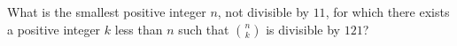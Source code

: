 What is the smallest positive integer $n$, not divisible by $11$, for which there exists a positive integer $k$ less than $n$ such that $\binom{n}{k}$ is divisible by $121$?
